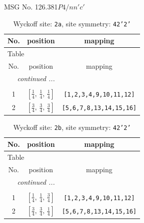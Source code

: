 \documentclass[fleqn,8pt]{jsarticle}
\begin{document}
\setcounter{MaxMatrixCols}{32}

\renewcommand{\tablename}{Table~}
\renewcommand{\figurename}{Figure~}
\begin{center}
\LARGE
MSG No. 126.381\quad$P4/nn'c'$
\end{center}
\renewcommand{\arraystretch}{1.2}
\begin{longtable}{ccc}
\caption{Wyckoff site: {\tt 2a}, site symmetry: {\tt 42'2'}}
 \\
 \hline \hline
No. & position & mapping \\ \hline \endfirsthead

\multicolumn{2}{l}{\tablename\ \thetable{}} \\
 \hline \hline
No. & position & mapping \\ \hline \endhead

 \hline \hline
\multicolumn{2}{r}{\footnotesize\it continued ...} \\ \endfoot

 \hline \hline
\multicolumn{2}{r}{} \\ \endlastfoot

1 & $\left[ \frac{1}{4},\, \frac{1}{4},\, \frac{1}{4} \right]$ & {\tt [1,2,3,4,9,10,11,12]} \\ \hline
2 & $\left[ \frac{3}{4},\, \frac{3}{4},\, \frac{3}{4} \right]$ & {\tt [5,6,7,8,13,14,15,16]} \\
\end{longtable}
\renewcommand{\arraystretch}{1.2}
\begin{longtable}{ccc}
\caption{Wyckoff site: {\tt 2b}, site symmetry: {\tt 42'2'}}
 \\
 \hline \hline
No. & position & mapping \\ \hline \endfirsthead

\multicolumn{2}{l}{\tablename\ \thetable{}} \\
 \hline \hline
No. & position & mapping \\ \hline \endhead

 \hline \hline
\multicolumn{2}{r}{\footnotesize\it continued ...} \\ \endfoot

 \hline \hline
\multicolumn{2}{r}{} \\ \endlastfoot

1 & $\left[ \frac{1}{4},\, \frac{1}{4},\, \frac{3}{4} \right]$ & {\tt [1,2,3,4,9,10,11,12]} \\ \hline
2 & $\left[ \frac{3}{4},\, \frac{3}{4},\, \frac{1}{4} \right]$ & {\tt [5,6,7,8,13,14,15,16]} \\
\end{longtable}
\end{document}
